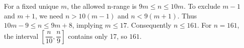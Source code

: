 For a fixed unique $m$, the allowed n-range is $9m\le n\le10m$. To exclude $m-1$ and $m+1$, we need $n>10(m-1)$ and $n<9(m+1)$. Thus $10m-9\le n\le9m+8$, implying $m\le17$. Consequently $n\le161$. For $n=161$, the interval $[\dfrac{n}{10},\dfrac{n}{9}]$ contains only 17, so $\boxed{161}$.
